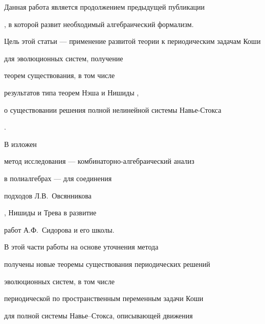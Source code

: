\date{}




\pagestyle{plain} %







\maketitle


\label{begin}








Данная работа является продолжением предыдущей публикации


\cite{Titov1}, в которой развит необходимый алгебраический формализм.


Цель этой статьи --- применение развитой теории к периодическим задачам Коши


\cite{SidorovKorzuninFilimonov}


для эволюционных систем, получение


теорем существования, в том числе 


результатов типа теорем Нэша и Нишиды \cite{3}, \cite{4}


о существовании решения полной нелинейной системы Навье-Стокса


\cite{Loytsyansky}.





В \cite{Titov1} изложен


метод исследования --- комбинаторно-алгебраический анализ


в полиалгебрах --- для соединения


подходов Л.В.~Овсянникова


\cite{Ovsyannikov}, Нишиды и Трева \cite{12} в развитие


работ А.Ф.~Сидорова \cite{SidorovKorzuninFilimonov} и его школы.


В этой части работы на основе уточнения метода


получены новые теоремы существования периодических решений


эволюционных систем, в том числе


периодической по пространственным переменным задачи Коши


для полной системы Навье--Стокса, описывающей движения


